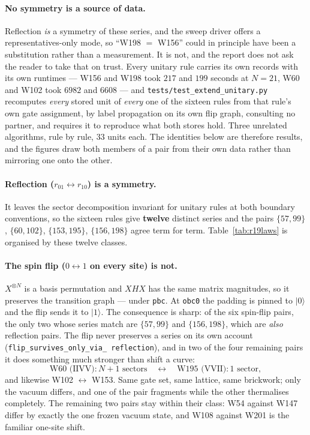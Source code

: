 \documentclass[11pt]{article}
\newcommand{\rt}[1]{\texttt{#1}}
\newcommand{\fn}[1]{\texttt{#1}}
\begin{document}
\paragraph{No symmetry is a source of data.} Reflection \emph{is} a symmetry of
these series, and the sweep driver offers a representatives-only mode, so
``W198 $=$ W156'' could in principle have been a substitution rather than a
measurement. It is not, and the report does not ask the reader to take that on
trust. Every unitary rule carries its own records with its own runtimes ---
W156 and W198 took $217$ and $199$ seconds at $N = 21$, W60 and W102 took
$6982$ and $6608$ --- and \fn{tests/test\_extend\_unitary.py} recomputes
\emph{every} stored unit of \emph{every} one of the sixteen rules from that
rule's own gate assignment, by label propagation on its own flip graph,
consulting no partner, and requires it to reproduce what both stores hold. Three
unrelated algorithms, rule by rule, $33$ units each. The identities below are
therefore results, and the figures draw both members of a pair from their own
data rather than mirroring one onto the other.

\paragraph{Reflection ($r_{01} \leftrightarrow r_{10}$) is a symmetry.} It leaves
the sector decomposition invariant for unitary rules at both boundary
conventions, so the sixteen rules give \textbf{twelve} distinct series and the
pairs $\{57,99\}$, $\{60,102\}$, $\{153,195\}$, $\{156,198\}$ agree term for
term. Table~\ref{tab:r19laws} is organised by these twelve classes.

\paragraph{The spin flip ($0 \leftrightarrow 1$ on every site) is not.}
$X^{\otimes N}$ is a basis permutation and $XHX$ has the same matrix magnitudes,
so it preserves the transition graph --- under \rt{pbc}. At \rt{obc0} the padding
is pinned to $|0\rangle$ and the flip sends it to $|1\rangle$. The consequence is
sharp: of the six spin-flip pairs, the only two whose series match are
$\{57,99\}$ and $\{156,198\}$, which are \emph{also} reflection pairs. The flip
never preserves a series on its own account (\fn{flip\_survives\_only\_via\_%
reflection}), and in two of the four remaining pairs it does something much
stronger than shift a curve:
\[
  \text{W60 (IIVV)}: N+1 \text{ sectors}
  \quad\longleftrightarrow\quad
  \text{W195 (VVII)}: 1 \text{ sector},
\]
and likewise W102 $\leftrightarrow$ W153. Same gate set, same lattice, same
brickwork; only the vacuum differs, and one of the pair fragments while the other
thermalises completely. The remaining two pairs stay within their class: W54
against W147 differ by exactly the one frozen vacuum state, and W108 against W201
is the familiar one-site shift.
\end{document}
